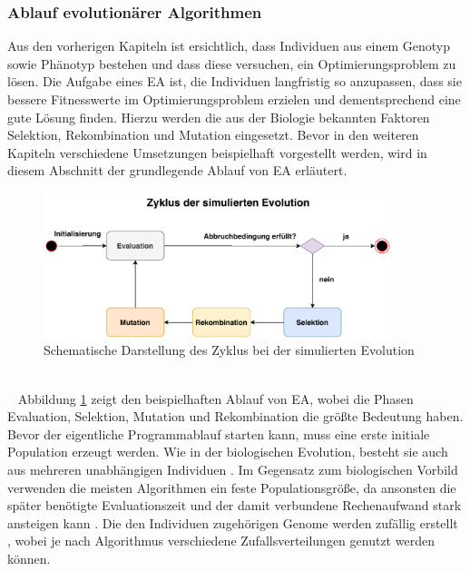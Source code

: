 \subsubsection{Ablauf evolutionärer Algorithmen}
Aus den vorherigen Kapiteln ist ersichtlich, dass Individuen aus einem Genotyp sowie Phänotyp bestehen und dass diese versuchen, ein Optimierungsproblem zu lösen. Die Aufgabe eines \ac{EA} ist, die Individuen langfristig so anzupassen, dass sie bessere Fitnesswerte im Optimierungsproblem erzielen und dementsprechend eine gute Lösung finden. Hierzu werden die aus der Biologie bekannten Faktoren Selektion, Rekombination und Mutation eingesetzt. Bevor in den weiteren Kapiteln verschiedene Umsetzungen beispielhaft vorgestellt werden, wird in diesem Abschnitt der grundlegende Ablauf von \ac{EA} erläutert.
\begin{figure}[h]
	\centering
	\includegraphics[width=0.9\textwidth]{./img/ea_basics/ea_cycle.pdf} 
	\caption{Schematische Darstellung des Zyklus bei der simulierten Evolution}
	\label{fig:ea_cycle}
\end{figure}
\\\ \noindent
Abbildung \ref{fig:ea_cycle} zeigt den beispielhaften Ablauf von \ac{EA}, wobei die Phasen Evaluation, Selektion, Mutation und Rekombination die größte Bedeutung haben. Bevor der eigentliche Programmablauf starten kann, muss eine erste initiale Population erzeugt werden. Wie in der biologischen Evolution, besteht sie auch aus mehreren unabhängigen Individuen \cite{rothlauf2006representation}. Im Gegensatz zum biologischen Vorbild verwenden die meisten Algorithmen ein feste Populationsgröße, da ansonsten die später benötigte Evaluationszeit und der damit verbundene Rechenaufwand stark ansteigen kann \cite{rothlauf2006representation}. Die den Individuen zugehörigen Genome werden zufällig erstellt \cite{weicker2015evolutionare}, wobei je nach Algorithmus verschiedene Zufallsverteilungen genutzt werden können.
\\\\
